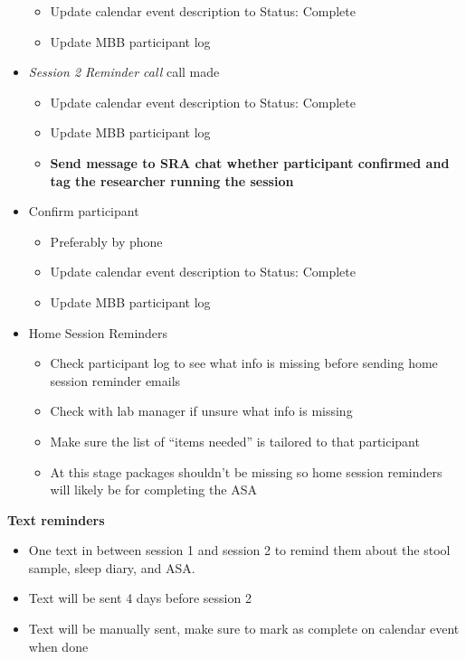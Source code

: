 \documentclass[]{book}
\providecommand{\tightlist}{%
  \setlength{\itemsep}{0pt}\setlength{\parskip}{0pt}}
\begin{document}
\begin{itemize}
  \begin{itemize}
  \tightlist
  \item
    Update calendar event description to Status: Complete
  \item
    Update MBB participant log
  \end{itemize}
\item
  \emph{Session 2 Reminder call} call made

  \begin{itemize}
  \tightlist
  \item
    Update calendar event description to Status: Complete
  \item
    Update MBB participant log
  \item
    \textbf{Send message to SRA chat whether participant confirmed and tag the researcher running the session}
  \end{itemize}
\item
  Confirm participant

  \begin{itemize}
  \tightlist
  \item
    Preferably by phone
  \item
    Update calendar event description to Status: Complete
  \item
    Update MBB participant log
  \end{itemize}
\item
  Home Session Reminders

  \begin{itemize}
  \tightlist
  \item
    Check participant log to see what info is missing before sending home session reminder emails\\
  \item
    Check with lab manager if unsure what info is missing\\
  \item
    Make sure the list of ``items needed'' is tailored to that participant
  \item
    At this stage packages shouldn't be missing so home session reminders will likely be for completing the ASA
  \end{itemize}
\end{itemize}

\textbf{Text reminders}

\begin{itemize}
\tightlist
\item
  One text in between session 1 and session 2 to remind them about the stool sample, sleep diary, and ASA.\\
\item
  Text will be sent 4 days before session 2
\item
  Text will be manually sent, make sure to mark as complete on calendar event when done
\end{itemize}
\end{document}

